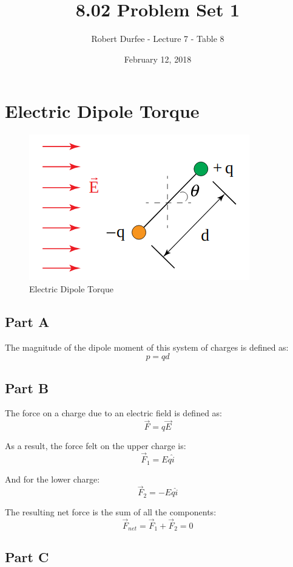 \documentclass{article}
\title{ 8.02 Problem Set 1 }
\author{ Robert Durfee - Lecture 7 - Table 8 }
\date{ February 12, 2018 }
\begin{document}
\maketitle

\section{ Electric Dipole Torque }

\begin{figure}[H]
  \centering
  \includegraphics[scale=0.5]{"ElectricDipoleTorque"}
  \caption{Electric Dipole Torque}
\end{figure}

\subsection*{Part A}

The magnitude of the dipole moment of this system of charges is defined as:
$$ p = qd $$

\subsection*{Part B}

The force on a charge due to an electric field is defined as:
$$ \vec{F} = q \vec{E} $$

As a result, the force felt on the upper charge is:
$$ \vec{F}_{1} = Eq \hat{i} $$

And for the lower charge:
$$ \vec{F}_{2} = -Eq \hat{i} $$

The resulting net force is the sum of all the components:
$$ \vec{F}_{net} = \vec{F}_{1} + \vec{F}_{2} = 0 $$

\subsection*{Part C}
\end{document}
